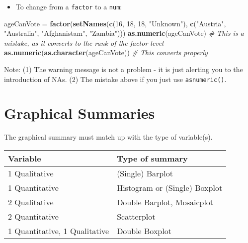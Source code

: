 \documentclass[]{article}
\newenvironment{Shaded}{\begin{snugshade}}{\end{snugshade}}
\newcommand{\CommentTok}[1]{\textcolor[rgb]{0.56,0.35,0.01}{\textit{#1}}}
\newcommand{\DecValTok}[1]{\textcolor[rgb]{0.00,0.00,0.81}{#1}}
\newcommand{\KeywordTok}[1]{\textcolor[rgb]{0.13,0.29,0.53}{\textbf{#1}}}
\newcommand{\NormalTok}[1]{#1}
\newcommand{\OperatorTok}[1]{\textcolor[rgb]{0.81,0.36,0.00}{\textbf{#1}}}
\newcommand{\StringTok}[1]{\textcolor[rgb]{0.31,0.60,0.02}{#1}}
\providecommand{\tightlist}{%
  \setlength{\itemsep}{0pt}\setlength{\parskip}{0pt}}
\begin{document}
\begin{Shaded}
\end{Shaded}

\begin{itemize}
\tightlist
\item
  To change from a \texttt{factor} to a \texttt{num}:
\end{itemize}

\begin{Shaded}
\begin{Highlighting}[]
\NormalTok{ageCanVote =}\StringTok{ }\KeywordTok{factor}\NormalTok{(}\KeywordTok{setNames}\NormalTok{(}\KeywordTok{c}\NormalTok{(}\DecValTok{16}\NormalTok{, }\DecValTok{18}\NormalTok{, }\DecValTok{18}\NormalTok{, }\StringTok{"Unknown"}\NormalTok{), }\KeywordTok{c}\NormalTok{(}\StringTok{"Austria"}\NormalTok{, }\StringTok{"Australia"}\NormalTok{, }\StringTok{"Afghanistam"}\NormalTok{, }\StringTok{"Zambia"}\NormalTok{)))}
\KeywordTok{as.numeric}\NormalTok{(ageCanVote)  }\CommentTok{# This is a mistake, as it converts to the rank of the factor level}
\KeywordTok{as.numeric}\NormalTok{(}\KeywordTok{as.character}\NormalTok{(ageCanVote))  }\CommentTok{# This converts properly}
\end{Highlighting}
\end{Shaded}

Note:
(1) The warning message is not a problem - it is just alerting you to the introduction of NAs.
(2) The mistake above if you just use \texttt{as\textquotesingle{}numeric()}.

\hypertarget{graphicalsummaries}{%
\section{Graphical Summaries}\label{graphicalsummaries}}

The graphical summary must match up with the type of variable(s).

\begin{longtable}[]{@{}ll@{}}
\toprule
Variable & Type of summary\tabularnewline
\midrule
\endhead
1 Qualitative & (Single) Barplot\tabularnewline
1 Quantitative & Histogram or (Single) Boxplot\tabularnewline
2 Qualitative & Double Barplot, Mosaicplot\tabularnewline
2 Quantitative & Scatterplot\tabularnewline
1 Quantitative, 1 Qualitative & Double Boxplot\tabularnewline
\bottomrule
\end{longtable}
\end{document}
